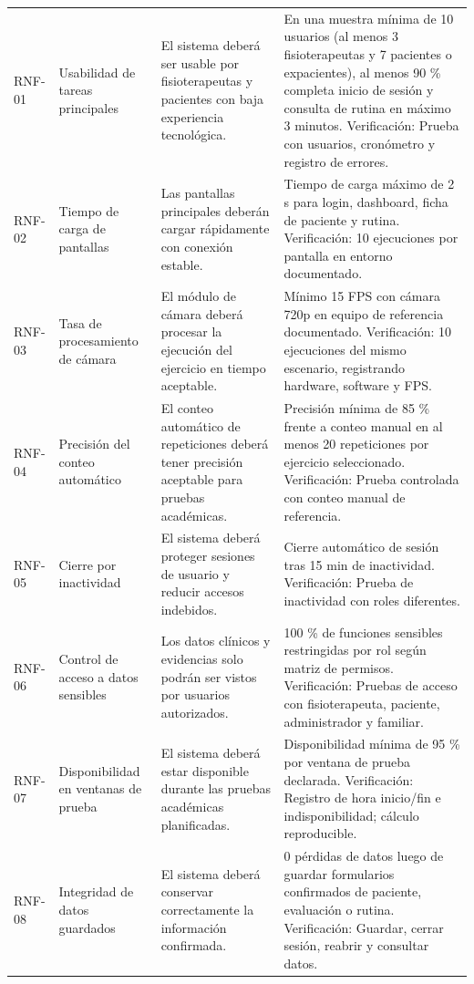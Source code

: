 \documentclass[12pt,a4paper]{article}
\begin{document}
\begin{longtable}{p{}p{}p{}p{}}
RNF-01 & Usabilidad de tareas principales & El sistema deberá ser usable por fisioterapeutas y pacientes con baja experiencia tecnológica. & En una muestra mínima de 10 usuarios (al menos 3 fisioterapeutas y 7 pacientes o expacientes), al menos 90 \% completa inicio de sesión y consulta de rutina en máximo 3 minutos. Verificación: Prueba con usuarios, cronómetro y registro de errores. \\
RNF-02 & Tiempo de carga de pantallas & Las pantallas principales deberán cargar rápidamente con conexión estable. & Tiempo de carga máximo de 2 s para login, dashboard, ficha de paciente y rutina. Verificación: 10 ejecuciones por pantalla en entorno documentado. \\
RNF-03 & Tasa de procesamiento de cámara & El módulo de cámara deberá procesar la ejecución del ejercicio en tiempo aceptable. & Mínimo 15 FPS con cámara 720p en equipo de referencia documentado. Verificación: 10 ejecuciones del mismo escenario, registrando hardware, software y FPS. \\
RNF-04 & Precisión del conteo automático & El conteo automático de repeticiones deberá tener precisión aceptable para pruebas académicas. & Precisión mínima de 85 \% frente a conteo manual en al menos 20 repeticiones por ejercicio seleccionado. Verificación: Prueba controlada con conteo manual de referencia. \\
RNF-05 & Cierre por inactividad & El sistema deberá proteger sesiones de usuario y reducir accesos indebidos. & Cierre automático de sesión tras 15 min de inactividad. Verificación: Prueba de inactividad con roles diferentes. \\
RNF-06 & Control de acceso a datos sensibles & Los datos clínicos y evidencias solo podrán ser vistos por usuarios autorizados. & 100 \% de funciones sensibles restringidas por rol según matriz de permisos. Verificación: Pruebas de acceso con fisioterapeuta, paciente, administrador y familiar. \\
RNF-07 & Disponibilidad en ventanas de prueba & El sistema deberá estar disponible durante las pruebas académicas planificadas. & Disponibilidad mínima de 95 \% por ventana de prueba declarada. Verificación: Registro de hora inicio/fin e indisponibilidad; cálculo reproducible. \\
RNF-08 & Integridad de datos guardados & El sistema deberá conservar correctamente la información confirmada. & 0 pérdidas de datos luego de guardar formularios confirmados de paciente, evaluación o rutina. Verificación: Guardar, cerrar sesión, reabrir y consultar datos. \\

\end{longtable}
\end{document}
